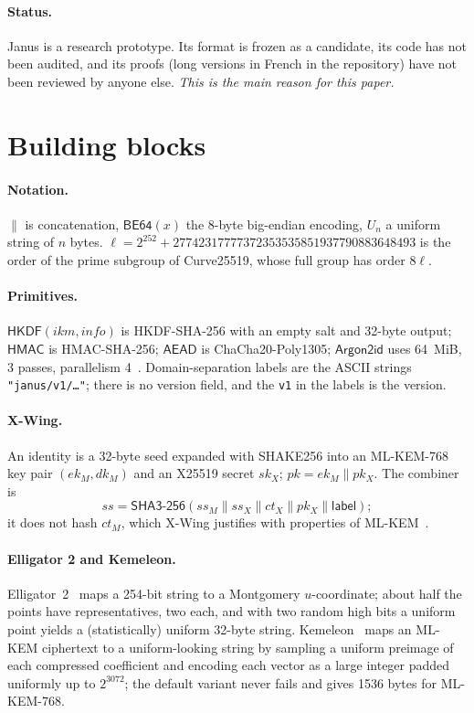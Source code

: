 \documentclass[11pt,a4paper]{article}
\theoremstyle{definition}
\theoremstyle{remark}
\newcommand{\HKDF}{\mathsf{HKDF}}
\newcommand{\HMAC}{\mathsf{HMAC}}
\newcommand{\AEAD}{\mathsf{AEAD}}
\newcommand{\Argon}{\mathsf{Argon2id}}
\newcommand{\SHA}{\mathsf{SHA3\text{-}256}}
\newcommand{\str}[1]{\texttt{"#1"}}
\begin{document}
\paragraph{Status.} Janus is a research prototype. Its format is frozen as a candidate, its code has not been audited, and its proofs (long versions in French in the repository) have not been reviewed by anyone else. \emph{This is the main reason for this paper.}

\section{Building blocks}
\label{sec:prelim}

\paragraph{Notation.} $\|$ is concatenation, $\mathsf{BE64}(x)$ the 8-byte big-endian encoding, $U_n$ a uniform string of $n$ bytes. $\ell = 2^{252}+27742317777372353535851937790883648493$ is the order of the prime subgroup of Curve25519, whose full group has order $8\ell$.

\paragraph{Primitives.} $\HKDF(\mathit{ikm},\mathit{info})$ is HKDF-SHA-256 with an empty salt and 32-byte output; $\HMAC$ is HMAC-SHA-256; $\AEAD$ is ChaCha20-Poly1305; $\Argon$ uses 64~MiB, 3 passes, parallelism 4~\cite{rfc9106}. Domain-separation labels are the ASCII strings \str{janus/v1/\dots}; there is no version field, and the \texttt{v1} in the labels is the version.

\paragraph{X-Wing.} An identity is a 32-byte seed expanded with SHAKE256 into an ML-KEM-768 key pair $(ek_M, dk_M)$ and an X25519 secret $sk_X$; $pk = ek_M\| pk_X$. The combiner is
\[ ss = \SHA(ss_M\|ss_X\|ct_X\|pk_X\|\mathsf{label}); \]
it does not hash $ct_M$, which X-Wing justifies with properties of ML-KEM~\cite{xwing}.

\paragraph{Elligator 2 and Kemeleon.} Elligator~2~\cite{elligator} maps a 254-bit string to a Montgomery $u$-coordinate; about half the points have representatives, two each, and with two random high bits a uniform point yields a (statistically) uniform 32-byte string. Kemeleon~\cite{kemeleon} maps an ML-KEM ciphertext to a uniform-looking string by sampling a uniform preimage of each compressed coefficient and encoding each vector as a large integer padded uniformly up to $2^{3072}$; the default variant never fails and gives 1536 bytes for ML-KEM-768.
\end{document}
